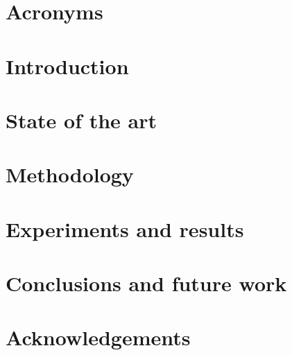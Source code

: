 \documentclass[12pt, a4paper]{article}
\begin{document}

% 

\newpage
{}
 

\tableofcontents\thispagestyle{empty}\newpage
\listoffigures\thispagestyle{empty}\newpage
\listoftables\thispagestyle{empty}\newpage

\section*{Acronyms}

\clearpage

\section{Introduction}
\label{sec:introduction}

\clearpage

\section{State of the art}
\label{sec:sota}

\clearpage

\section{Methodology}
\label{sec:methodology}

\clearpage

\section{Experiments and results}
\label{sec:experiments_and_results}

\clearpage

\section{Conclusions and future work}
\label{sec:conclusions_and_future_work}

\clearpage

\newpage
\section*{Acknowledgements}
\label{acknowledgements}

\newpage

\newpage\printbibliography
{}
\newpage

\begin{appendices}
  
\end{appendices}
\end{document}
